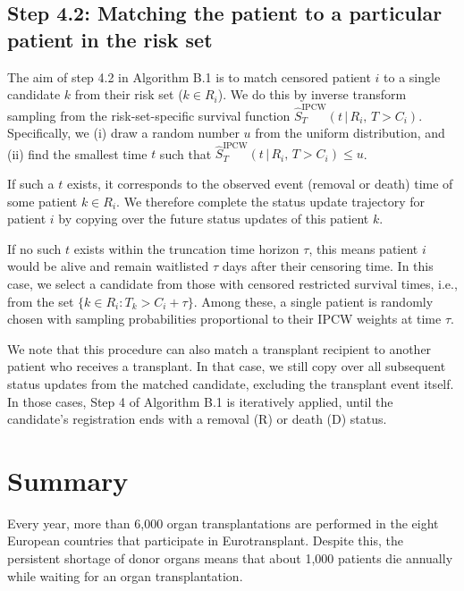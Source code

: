 \documentclass[11pt,twoside,]{book}
\begin{document}
\FloatBarrier

\section{Step 4.2: Matching the patient to a particular patient in the risk set}\label{step-4.2-matching-the-patient-to-a-particular-patient-in-the-risk-set}

The aim of step 4.2 in Algorithm B.1 is to match censored patient \(i\) to a single candidate \(k\) from their risk set (\(k\in
R_i\)). We do this by inverse transform sampling from the
risk-set-specific survival function
\(\hat{S}^{\text{IPCW}}_T(t\,|\,R_i,\, T > C_i)\). Specifically, we
(i) draw a random number \(u\) from the uniform distribution, and
(ii) find the smallest time \(t\) such that \(\hat{S}^{\text{IPCW}}_T(t\,|\,R_i,\, T > C_i) \leq u\).

If such a \(t\) exists, it corresponds to the observed event
(removal or death) time of some patient \(k \in R_i\). We therefore
complete the status update trajectory for patient \(i\) by copying
over the future status updates of this patient \(k\).

If no such \(t\) exists within the truncation time horizon \(\tau\),
this means patient \(i\) would be alive and remain waitlisted
\(\tau\) days after their censoring time. In this case, we select a
candidate from those with censored restricted survival times,
i.e., from the set \(\{k \in R_i : T_k > C_i + \tau\}\). Among
these, a single patient is randomly chosen with sampling
probabilities proportional to their IPCW weights at time \(\tau\).

We note that this procedure can also match a transplant recipient to
another patient who receives a transplant. In that case, we still
copy over all subsequent status updates from the matched candidate,
excluding the transplant event itself. In those cases, Step 4
of Algorithm B.1 is iteratively applied, until the candidate's
registration ends with a removal (R) or death (D) status.

\chapter*{Summary}\label{summary}


Every year, more than 6,000 organ transplantations are performed in the eight
European countries that participate in Eurotransplant. Despite this, the persistent
shortage of donor organs means that about 1,000 patients die annually while waiting for
an organ transplantation.
\end{document}
